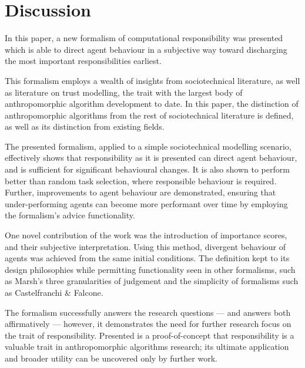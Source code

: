 \section{Discussion}\label{sec:discussion}
In this paper, a new formalism of computational responsibility was presented which is able to direct agent behaviour in a subjective way toward discharging the most important responsibilities earliest.\par

This formalism employs a wealth of insights from sociotechnical literature, as well as literature on trust modelling, the trait with the largest body of anthropomorphic algorithm development to date. In this paper, the distinction of anthropomorphic algorithms from the rest of sociotechnical literature is defined, as well as its distinction from existing fields.\par

The presented formalism, applied to a simple sociotechnical modelling scenario, effectively shows that responsibility as it is presented can direct agent behaviour, and is sufficient for significant behavioural changes. It is also shown to perform better than random task selection, where responsible behaviour is required. Further, improvements to agent behaviour are demonstrated, ensuring that under-performing agents can become more performant over time by employing the formalism's advice functionality.\par

One novel contribution of the work was the introduction of importance scores, and their subjective interpretation. Using this method, divergent behaviour of agents was achieved from the same initial conditions. The definition kept to its design philosophies while permitting functionality seen in other formalisms, such as Marsh's three granularities of judgement and the simplicity of formalisms such as Castelfranchi \& Falcone.\par

The formalism successfully answers the research questions --- and answers both affirmatively --- however, it demonstrates the need for further research focus on the trait of responsibility. Presented is a proof-of-concept that responsibility is a valuable trait in anthropomorphic algorithms research; its ultimate application and broader utility can be uncovered only by further work.




